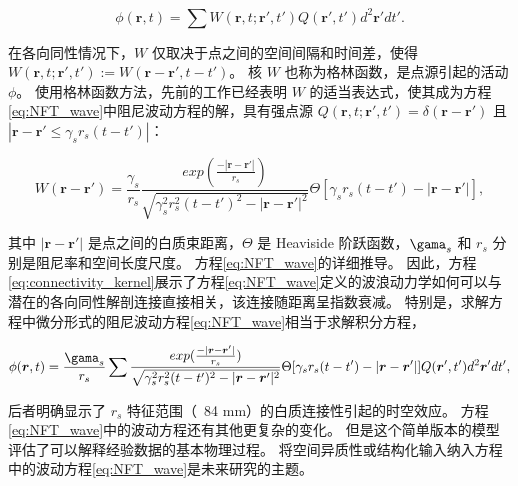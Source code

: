 \documentclass[lang=cn,a4paper,newtx,citestyle=gb7714-2015, bibstyle=gb7714-2015]{elegantpaper}
\begin{document}
\begin{equation}\label{eq:location_activity}
	\phi(\boldsymbol{r}, t) = 
		\sum
			W(\boldsymbol{r}, t; \boldsymbol{r}', t')
			Q(\boldsymbol{r}', t')
			d^2
			\boldsymbol{r}'
			dt'.
\end{equation}


在各向同性情况下，$ W $ 仅取决于点之间的空间间隔和时间差，使得 $ W(\boldsymbol{r}, t; \boldsymbol{r}', t') := W(\boldsymbol{r} - \boldsymbol{r}', t-t') $。
核 $ W $ 也称为格林函数，是点源引起的活动 $ \phi $。
使用格林函数方法\cite{pang2021stochastic}，先前的工作已经表明 $ W $ 的适当表达式，使其成为方程\ref{eq:NFT_wave}中阻尼波动方程的解，具有强点源 
$ Q(\boldsymbol{r}, t; \boldsymbol{r}', t') = \delta(\boldsymbol{r} - \boldsymbol{r}') $ 且 
$ |\boldsymbol{r} - \boldsymbol{r}' \leq \gamma_s r_s (t-t')| $：\cite{wright1995simulation,jirsa1996field,robinson1997propagation,nozari2020brain}

\begin{equation}\label{eq:connectivity_kernel}
	W(\boldsymbol{r} - \boldsymbol{r}') = 
		\frac{\gamma_s}{r_s}
		\frac{exp(\frac{-|\boldsymbol{r}-\boldsymbol{r}'|}{r_s})}{\sqrt{\gamma_s^2 r_s^2 (t-t')^2 - |\boldsymbol{r} - \boldsymbol{r}'|^2}}
		\Theta
		[\gamma_s r_s (t-t') - |\boldsymbol{r} - \boldsymbol{r}'|],
\end{equation}

其中 $ |\boldsymbol{r} - \boldsymbol{r}'| $ 是点之间的白质束距离，$ \Theta $ 是 Heaviside 阶跃函数，$ \gama_s $ 和 $ r_s $ 分别是阻尼率和空间长度尺度。
方程\ref{eq:NFT_wave}的详细推导。 
因此，方程\ref{eq:connectivity_kernel}展示了方程\ref{eq:NFT_wave}定义的波浪动力学如何可以与潜在的各向同性解剖连接直接相关，该连接随距离呈指数衰减。
特别是，求解方程中微分形式的阻尼波动方程\ref{eq:NFT_wave}相当于求解积分方程，

\begin{equation}\label{eq:integral_equation}
	\phi(\boldsymbol{r}, t) = 
		\frac{\gama_s}{r_s} \sum
			\frac{exp(\frac{-|\boldsymbol{r}-\boldsymbol{r}'|}{r_s})}{\sqrt{\gamma_s^2 r_s^2 (t-t')^2 - |\boldsymbol{r} - \boldsymbol{r}'|^2}}
			\Theta
			[\gamma_s r_s (t-t') - |\boldsymbol{r} - \boldsymbol{r}'|]
			Q(\boldsymbol{r}', t')
			d^2 \boldsymbol{r}'
			dt',
\end{equation}

后者明确显示了 $ r_s $ 特征范围（~84 mm\cite{robinson1997propagation}）的白质连接性引起的时空效应。
方程\ref{eq:NFT_wave}中的波动方程还有其他更复杂的变化。
但是这个简单版本的模型评估了可以解释经验数据的基本物理过程。
将空间异质性或结构化输入纳入方程中的波动方程\ref{eq:NFT_wave}是未来研究的主题。
\end{document}
